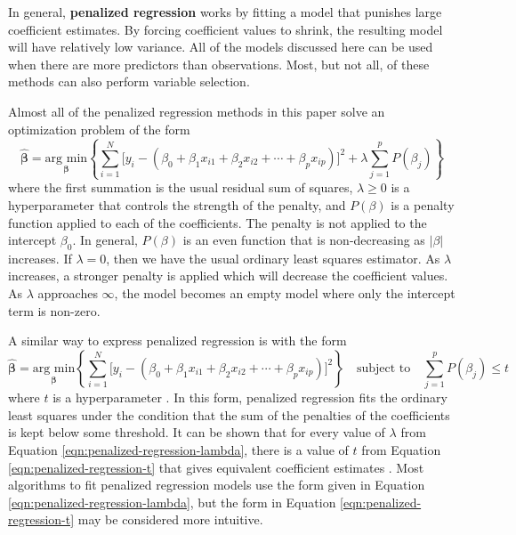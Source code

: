 \documentclass{article}
\newcommand{\argmin}[2]{\underset{#1}{\text{arg min}}\left\{#2\right\}}
\begin{document}
In general, \textbf{penalized regression} works by fitting a model that punishes large coefficient estimates. By forcing coefficient values to shrink, the resulting model will have relatively low variance. All of the models discussed here can be used when there are more predictors than observations. Most, but not all, of these methods can also perform variable selection.

Almost all of the penalized regression methods in this paper solve an optimization problem of the form
\begin{equation}\label{eqn:penalized-regression-lambda}
	\hat{\bm{\beta}}=\argmin{\bm{\beta}}{\sum\limits_{i = 1}^N \Big[y_i - (\beta_0 + \beta_1 x_{i1} + \beta_2 x_{i2} + \cdots + \beta_p x_{ip})\Big]^2 + \lambda\sum\limits_{j = 1}^p P(\beta_j)}
\end{equation}
where the first summation is the usual residual sum of squares, $\lambda\geq 0$ is a hyperparameter that controls the strength of the penalty, and $P(\beta)$ is a penalty function applied to each of the coefficients. The penalty is not applied to the intercept $\beta_0$. In general, $P(\beta)$ is an even function that is non-decreasing as $\vert \beta \vert$ increases. If $\lambda = 0$, then we have the usual ordinary least squares estimator. As $\lambda$ increases, a stronger penalty is applied which will decrease the coefficient values. As $\lambda$ approaches $\infty$, the model becomes an empty model where only the intercept term is non-zero.

A similar way to express penalized regression is with the form
\begin{equation}\label{eqn:penalized-regression-t}
	\hat{\bm{\beta}} = \argmin{\bm{\beta}}{\sum\limits_{i = 1}^N \Big[y_i - (\beta_0 + \beta_1 x_{i1} + \beta_2 x_{i2} + \cdots + \beta_p x_{ip})\Big]^2} \quad \text{subject to} \quad \sum\limits_{j = 1}^p P(\beta_j)\leq t
\end{equation}
where $t$ is a hyperparameter \cite{james2013introduction, friedman2001elements}. In this form, penalized regression fits the ordinary least squares under the condition that the sum of the penalties of the coefficients is kept below some threshold. It can be shown that for every value of $\lambda$ from Equation \ref{eqn:penalized-regression-lambda}, there is a value of $t$ from Equation \ref{eqn:penalized-regression-t} that gives equivalent coefficient estimates \cite{james2013introduction}. Most algorithms to fit penalized regression models use the form given in Equation \ref{eqn:penalized-regression-lambda}, but the form in Equation \ref{eqn:penalized-regression-t} may be considered more intuitive.
\end{document}
